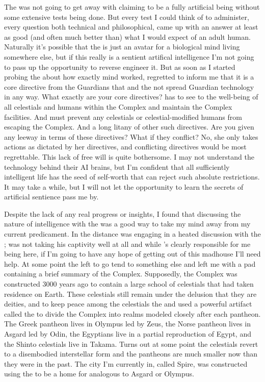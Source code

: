 \documentclass[char]{guardians}
\begin{document}
The \cCaretaker{} was not going to get away with claiming to be a fully artificial being without some extensive tests being done. But every test I could think of to administer, every question both technical and philosophical, \cCaretaker{\they} came up with an answer at least as good (and often much better than) what I would expect of an adult human. Naturally it's possible that the \cCaretaker{} is just an avatar for a biological mind living somewhere else, but if this really is a sentient artifical intelligence I'm not going to pass up the opportunity to reverse engineer it. But as soon as I started probing the \cCaretaker{} about how exactly \cCaretaker{\their} mind worked, \cCaretaker{\they} regretted to inform me that it is a core directive from the Guardians that \cCaretaker{\they} and the \cWarden{} not spread Guardian technology in any way. What exactly are your core directives? \cCaretaker{\They} has to see to the well-being of all celestials and humans within the Complex and maintain the Complex facilities. And \cCaretaker{\they} must prevent any celestials or celestial-modified humans from escaping the Complex. And a long litany of other such  directives. Are you given any leeway in terms of these directives? What if they conflict? No, she only takes actions as dictated by her directives, and conflicting directives would be most regrettable. This lack of free will is quite bothersome. I may not understand the technology behind their AI brains, but I'm confident that all sufficiently intelligent life has the seed of self-worth that can reject such absolute restrictions. It may take a while, but I will not let the opportunity to learn the secrets of artificial sentience pass me by.

Despite the lack of any real progress or insights, I found that discussing the nature of intelligence with the \cCaretaker{} was a good way to take my mind away from my current predicament. In the distance \cUnity{} was engaging in a heated discussion with the \cWarden{}; \cUnity{} was not taking his captivity well at all and while \cUnity{\they}'s clearly responsible for me being here, if I'm going to have any hope of getting out of this madhouse I'll need \cUnity{\their} help. At some point the \cCaretaker{} left to go tend to something else and left me with a pad containing a brief summary of the Complex. Supposedly, the Complex was constructed 3000 years ago to contain a large school of celestials that had taken residence on Earth. These celestials still remain under the delusion that they are deities, and to keep peace among the celestials the \cCaretaker{} and \cWarden{} used a powerful artifact called the \stone{} to divide the Complex into realms modeled closely after each pantheon. The Greek pantheon lives in Olympus led by Zeus, the Norse pantheon lives in Asgard led by Odin, the Egyptians live in a partial reproduction of Egypt, and the Shinto celestials live in Takama. Turns out at some point the celestials revert to a disembodied interstellar form and the pantheons are much smaller now than they were in the past. The city I'm currently in, called Spire, was constructed using the \stone{} to be a home for \cUnity{} analogous to Asgard or Olympus.
\end{document}

